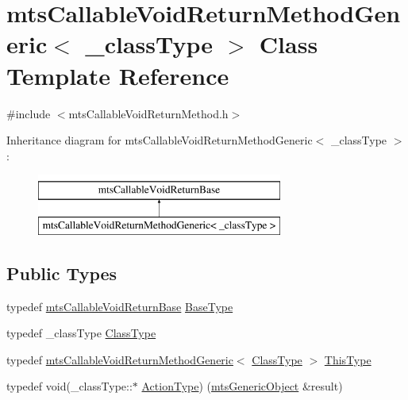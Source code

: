 \hypertarget{classmts_callable_void_return_method_generic}{}\section{mts\+Callable\+Void\+Return\+Method\+Generic$<$ \+\_\+class\+Type $>$ Class Template Reference}
\label{classmts_callable_void_return_method_generic}


{\ttfamily \#include $<$mts\+Callable\+Void\+Return\+Method.\+h$>$}

Inheritance diagram for mts\+Callable\+Void\+Return\+Method\+Generic$<$ \+\_\+class\+Type $>$\+:\begin{figure}[H]
\begin{center}
\leavevmode
\includegraphics[height=2.000000cm]{d7/d8e/classmts_callable_void_return_method_generic}
\end{center}
\end{figure}
\subsection*{Public Types}
\begin{DoxyCompactItemize}
\item 
typedef \hyperlink{classmts_callable_void_return_base}{mts\+Callable\+Void\+Return\+Base} \hyperlink{classmts_callable_void_return_method_generic_aa1fd13b7b6b83b7825a8e7c56e9ac8cd}{Base\+Type}
\item 
typedef \+\_\+class\+Type \hyperlink{classmts_callable_void_return_method_generic_ac65a16eb6baf786e6eba07bb920cbf1f}{Class\+Type}
\item 
typedef \hyperlink{classmts_callable_void_return_method_generic}{mts\+Callable\+Void\+Return\+Method\+Generic}$<$ \hyperlink{classmts_callable_void_return_method_generic_ac65a16eb6baf786e6eba07bb920cbf1f}{Class\+Type} $>$ \hyperlink{classmts_callable_void_return_method_generic_a0c47816060134c2ec22f9287de913cc5}{This\+Type}
\item 
typedef void(\+\_\+class\+Type\+::$\ast$ \hyperlink{classmts_callable_void_return_method_generic_ad94bb941833d1c2d74bb718f3bf81456}{Action\+Type}) (\hyperlink{classmts_generic_object}{mts\+Generic\+Object} \&result)
\end{DoxyCompactItemize}
